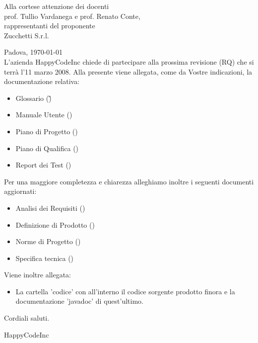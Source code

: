 


\newcommand{\dt}{ Lettera di accompagnamento }%




\thispagestyle{plain}
\begin{flushright}
Alla cortese attenzione dei docenti\\
prof. Tullio Vardanega e prof. Renato Conte,\\
rappresentanti del proponente\\
Zucchetti S.r.l.
\end{flushright}
Padova, \today \\

L'azienda HappyCodeInc chiede di partecipare alla prossima revisione (RQ) che si terr\`a l'11 marzo 2008.
Alla presente viene allegata, come da Vostre indicazioni, la documentazione relativa:
\begin{itemize}
\item{}Glossario (\G)
\item{}Manuale Utente (\MU)
\item{}Piano di Progetto (\PdP)
\item{}Piano di Qualifica (\PdQ)
\item{}Report dei Test (\TR)
\end{itemize}
Per una maggiore completezza e chiarezza alleghiamo inoltre i seguenti documenti aggiornati:
\begin{itemize}
\item{}Analisi dei Requisiti (\AR)
\item{}Definizione di Prodotto (\DdP)
\item{}Norme di Progetto (\NdP)
\item{}Specifica tecnica (\ST) 
\end{itemize}
Viene inoltre allegata:
\begin{itemize}
\item{La  cartella 'codice' con all'interno il codice sorgente prodotto finora e la documentazione 'javadoc' di quest'ultimo.}
\end{itemize}

Cordiali saluti.
\begin{flushright}
HappyCodeInc
\end{flushright}
\newpage


